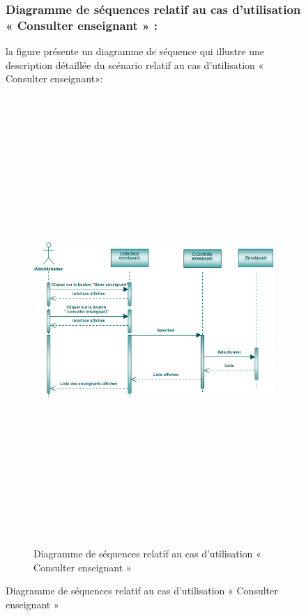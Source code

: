 \documentclass[12 pt]{report}
\begin{document}
\begin{figure}[h]
\begin{center}
\subsubsection{Diagramme de séquences relatif au cas d’utilisation « Consulter enseignant » :}
la figure   présente un diagramme de séquence qui illustre une description détaillée du scénario relatif au cas d’utilisation «  Consulter enseignant»: 
{\begin{figure}[h]
 \begin{center}
\includegraphics[width= 18 cm ,height=  17cm]{sec_cons_ens.PNG}
\caption{Diagramme de séquences relatif au cas d’utilisation « Consulter enseignant »}

\end{center}
\end{figure}}
\newpage

\end{center}
\end{figure}
\end{document}
